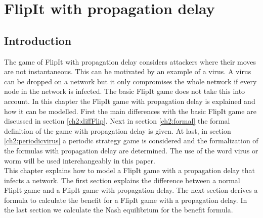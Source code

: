 \chapter{FlipIt with propagation delay}
\label{chapter2:FlipIt with virus propagation}
%


\section{Introduction}
\label{Ch2:Intro}
The game of FlipIt with propagation delay considers attackers where their moves are not instantaneous. This can be motivated by an example of a virus. A virus can be dropped on a network but it only compromises the whole network if every node in the network is infected. The basic FlipIt game does not take this into account. In this chapter the FlipIt game with propagation delay is explained and how it can be modelled. First the main differences with the basic FlipIt game are discussed in section \ref{ch2:diffFlip}. Next in section \ref{ch2:formal} the formal definition of the game with propagation delay is given. At last, in section \ref{ch2:periodicvirus} a periodic strategy game is considered and the formalization of the formulas with propagation delay are determined. The use of the word virus or worm will be used interchangeably in this paper. \\

This chapter explains how to model a FlipIt game with a propagation delay that infects a network. The first section explains the difference between a normal FlipIt game and a FlipIt game with propagation delay. The next section derives a formula to calculate the benefit for a FlipIt game with a  propagation delay. In the last section we calculate the Nash equilibrium for the benefit formula.
%
%
%

